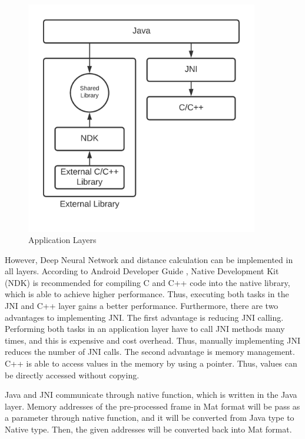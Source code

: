         \begin{figure}[!ht]
            \centering
            \includegraphics[width=4in]{images/chapter3/application-layers.png}
            \caption{Application Layers}
            \label{systemOverview}
        \end{figure}

        However, Deep Neural Network and distance calculation can be implemented in all layers.
        According to Android Developer Guide \cite{ANDROID-01},
        Native Development Kit (NDK) is recommended for compiling C and C++ code into the native library,
        which is able to achieve higher performance.
        Thus, executing both tasks in the JNI and C++ layer gains a better performance.
        Furthermore, there are two advantages to implementing JNI.
            The first advantage is reducing JNI calling. Performing both tasks in an application layer have to call JNI methods many times,
                and this is expensive and cost overhead.
                Thus, manually implementing JNI reduces the number of JNI calls.
            The second advantage is memory management. C++ is able to access values in the memory by using a pointer.
                Thus, values can be directly accessed without copying.

        Java and JNI communicate through native function, which is written in the Java layer.
        Memory addresses of the pre-processed frame in Mat format will be pass as a parameter through native function,
        and it will be converted from Java type to Native type.
        Then, the given addresses will be converted back into Mat format.

